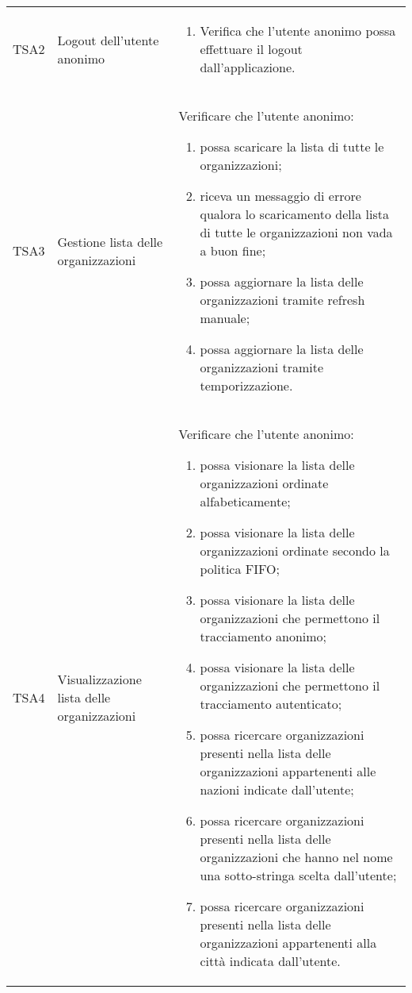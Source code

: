 {\begin{longtable}{ c | C{3cm} | C{11cm} }
TSA2  & Logout dell'utente anonimo & \begin{enumerate}
    \item Verifica che l'utente anonimo possa effettuare il logout dall'applicazione.
\end{enumerate} \\

TSA3 & Gestione lista delle organizzazioni &
Verificare che l'utente anonimo:
\begin{enumerate}
    \item possa scaricare la lista di tutte le organizzazioni;
    \item riceva un messaggio di errore qualora lo scaricamento della lista di tutte le organizzazioni non vada a buon fine;
    \item possa aggiornare la lista delle organizzazioni tramite refresh manuale;
    \item possa aggiornare la lista delle organizzazioni tramite temporizzazione.
\end{enumerate} \\

TSA4 & Visualizzazione lista delle organizzazioni & 
Verificare che l'utente anonimo:
\begin{enumerate}
    \item possa visionare la lista delle organizzazioni ordinate alfabeticamente;
    \item possa visionare la lista delle organizzazioni ordinate secondo la politica FIFO;
    \item possa visionare la lista delle organizzazioni che permettono il tracciamento anonimo;
    \item possa visionare la lista delle organizzazioni che permettono il tracciamento autenticato;
    \item possa ricercare organizzazioni presenti nella lista delle organizzazioni appartenenti alle nazioni indicate dall'utente;
    \item possa ricercare organizzazioni presenti nella lista delle organizzazioni che hanno nel nome una sotto-stringa scelta dall'utente;
    \item possa ricercare organizzazioni presenti nella lista delle organizzazioni appartenenti alla città indicata dall'utente.
\end{enumerate} \\


\end{longtable}}
